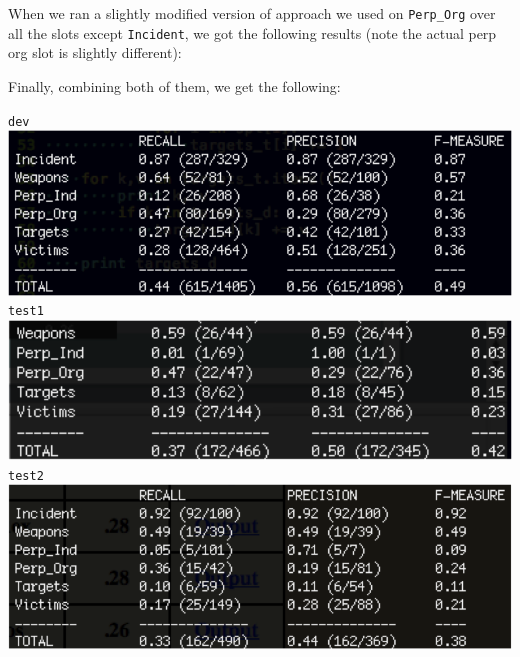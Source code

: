 \documentclass[11pt]{myclass}
\begin{document}
When we ran a slightly modified version of approach we used on \texttt{Perp\_Org} over all the slots except \texttt{Incident}, we got the following results (note the actual perp org slot is slightly different):



Finally, combining both of them, we get the following:

\texttt{dev}
\includegraphics[scale=0.75]{amphist_dev.png} \\

\texttt{test1}
\includegraphics[scale=0.75]{amphist_t1.png} \\

\texttt{test2}
\includegraphics[scale=0.75]{amphist_t2.png} \\
\end{document}
